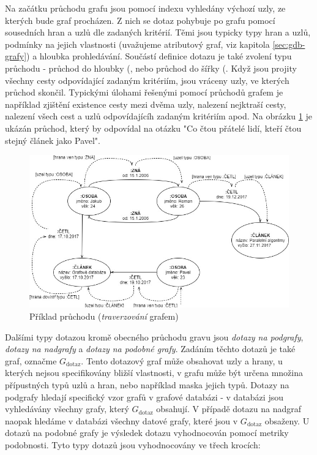 Na začátku průchodu grafu jsou pomocí indexu vyhledány výchozí uzly, ze kterých bude graf procházen. Z nich se dotaz pohybuje po grafu pomocí sousedních hran a uzlů dle zadaných kritérií. Těmi jsou typicky typy hran a uzlů, podmínky na jejich vlastnosti (uvažujeme atributový graf, viz kapitola \ref{sec:gdb-grafy}) a hloubka prohledávání. Součástí definice dotazu je také zvolení typu průchodu - průchod do hloubky (\textit{}, nebo průchod do šířky (\textit{}. Když jsou projity všechny cesty odpovídající zadaným kritériím, jsou vráceny uzly, ve kterých průchod skončil. Typickými úlohami řešenými pomocí průchodů grafem je například zjištění existence cesty mezi dvěma uzly, nalezení nejktraší cesty, nalezení všech cest a uzlů odpovídajícíh zadaným kritériím apod. Na obrázku \ref{fig:traversal} je ukázán průchod, který by odpovídal na otázku "Co čtou přátelé lidí, kteří čtou stejný článek jako Pavel".

\begin{figure}
\begin{center}
\includegraphics[width=14cm]{figures/traversal}
\caption{Příklad průchodu (\textit{traverzování} grafem)}
\label{fig:traversal}
\end{center}
\end{figure}

Dalšími typy dotazou kromě obecného průchodu gravu jsou \textit{dotazy na podgrafy}, \textit{dotazy na nadgrafy} a \textit{dotazy na podobné grafy}. Zadáním těchto dotazů je také graf, označme \textit{$G_\mathrm{dotaz}$}. Tento dotazový graf může obsahovat uzly a hrany, u kterých nejsou specifikovány bližší vlastnosti, v grafu může být určena množina přípustných typů uzlů a hran, nebo například maska jejich typů. Dotazy na podgrafy hledají specifický vzor grafů v grafové databázi - v databázi jsou vyhledávány všechny grafy, který \textit{$G_\mathrm{dotaz}$} obsahují. V případě dotazu na nadgraf naopak hledáme v databázi všechny datové grafy, které jsou v \textit{$G_\mathrm{dotaz}$} obsaženy. U dotazů na podobné grafy je výsledek dotazu vyhodnocován pomocí metriky podobnosti.\cite{Koutra11} Tyto typy dotazů jsou vyhodnocovány ve třech krocích:

